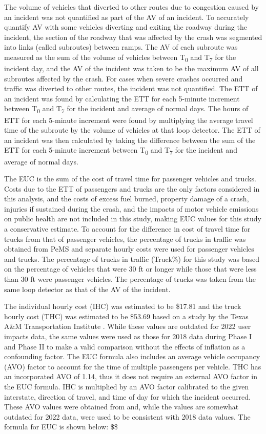 \documentclass[
  letterpaper,
  authoryear]{elsarticle}
\begin{document}
The volume of vehicles that diverted to other routes due to congestion
caused by an incident was not quantified as part of the AV of an
incident. To accurately quantify AV with some vehicles diverting and
exiting the roadway during the incident, the section of the roadway that
was affected by the crash was segmented into links (called subroutes)
between ramps. The AV of each subroute was measured as the sum of the
volume of vehicles between T\textsubscript{0} and T\textsubscript{7} for
the incident day, and the AV of the incident was taken to be the maximum
AV of all subroutes affected by the crash. For cases when severe crashes
occurred and traffic was diverted to other routes, the incident was not
quantified. The ETT of an incident was found by calculating the ETT for
each 5-minute increment between T\textsubscript{0} and
T\textsubscript{7} for the incident and average of normal days. The
hours of ETT for each 5-minute increment were found by multiplying the
average travel time of the subroute by the volume of vehicles at that
loop detector. The ETT of an incident was then calculated by taking the
difference between the sum of the ETT for each 5-minute increment
between T\textsubscript{0} and T\textsubscript{7} for the incident and
average of normal days.

The EUC is the sum of the cost of travel time for passenger vehicles and
trucks. Costs due to the ETT of passengers and trucks are the only
factors considered in this analysis, and the costs of excess fuel
burned, property damage of a crash, injuries if sustained during the
crash, and the impacts of motor vehicle emissions on public health are
not included in this study, making EUC values for this study a
conservative estimate. To account for the difference in cost of travel
time for trucks from that of passenger vehicles, the percentage of
trucks in traffic was obtained from PeMS and separate hourly costs were
used for passenger vehicles and trucks. The percentage of trucks in
traffic (Truck\%) for this study was based on the percentage of vehicles
that were 30 ft or longer while those that were less than 30 ft were
passenger vehicles. The percentage of trucks was taken from the same
loop detector as that of the AV of the incident.

The individual hourly cost (IHC) was estimated to be \$17.81 and the
truck hourly cost (THC) was estimated to be \$53.69 based on a study by
the Texas A\&M Transportation Institute \citep{ellis_value_2017} . While
these values are outdated for 2022 user impacts data, the same values
were used as those for 2018 data during Phase I and Phase II to make a
valid comparison without the effects of inflation as a confounding
factor. The EUC formula also includes an average vehicle occupancy (AVO)
factor to account for the time of multiple passengers per vehicle. THC
has an incorporated AVO of 1.14, thus it does not require an external
AVO factor in the EUC formula. IHC is multiplied by an AVO factor
calibrated to the given interstate, direction of travel, and time of day
for which the incident occurred. These AVO values were obtained from
\citet{schultz_ut1503_2015} and, while the values are somewhat outdated
for 2022 data, were used to be consistent with 2018 data values. The
formula for EUC is shown below: \$\$
\end{document}
